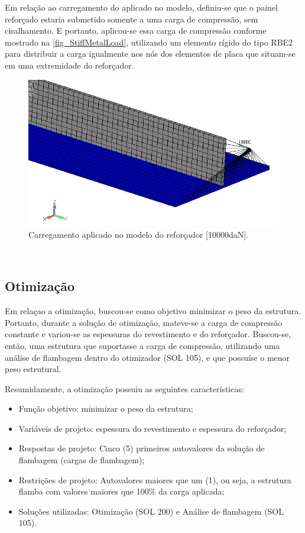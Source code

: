 {Em relação ao carregamento do aplicado no modelo, definiu-se que o painel reforçado estaria submetido somente a uma carga de compressão, sem cisalhamento. E portanto, aplicou-se essa carga de compressão conforme mostrado na \autoref{fig_StiffMetalLoad},
utilizando um elemento rígido do tipo RBE2 para distribuir a carga igualmente nos nós dos elementos de placa que situam-se em uma extremidade do reforçador.

\begin{figure}[h]
	\caption{\label{fig_StiffMetalLoad}Carregamento aplicado no modelo do reforçador [10000daN].}
  \centering
  \includegraphics[scale=0.7]{figura/StiffMetalLoad}
\end{figure}
\

\subsection{Otimização}
Em relaçao a otimização, buscou-se como objetivo minimizar o peso da estrutura. Portanto, durante a solução de otimização, mateve-se a carga de compressão constante e variou-se as espessuras do revestimento e do reforçador. Buscou-se, então, uma estrutura que suportasse a carga de compressão, utilizando uma análise de flambagem dentro do otimizador (SOL 105), e que possuíse o menor peso estrutural.

Resumidamente, a otimização possuiu as seguintes características:
\begin{itemize}
\item Função objetivo: minimizar o peso da estrutura;
\item Variáveis de projeto: espessura do revestimento e espessura do reforçador;
\item Respostas de projeto: Cinco (5) primeiros autovalores da solução de flambagem (cargas de flambagem);
\item Restrições de projeto: Autovalores maiores que um (1), ou seja, a estrutura flamba com valores maiores que 100\% da carga aplicada;
\item Soluções utilizadas: Otimização (SOL 200) e Análise de flambagem (SOL 105).
\end{itemize}

}
